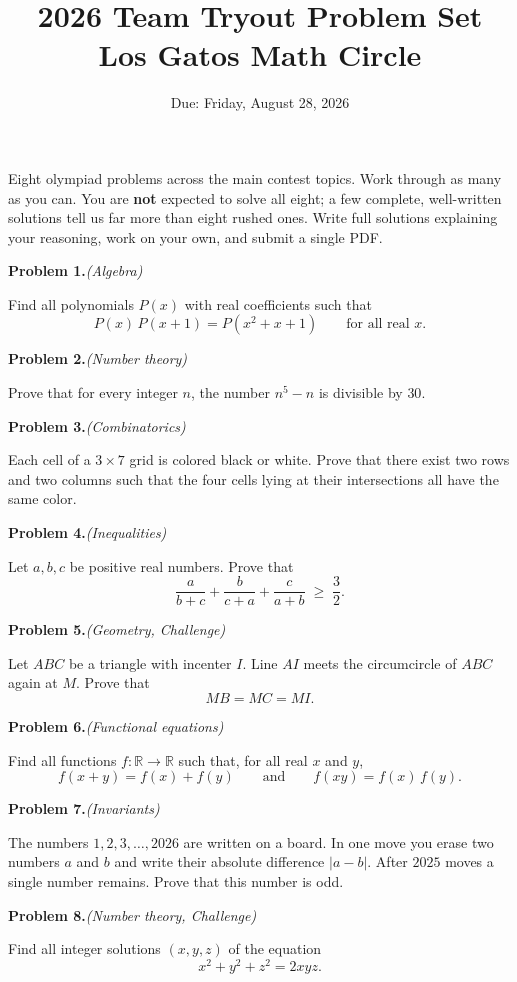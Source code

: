 \documentclass[11pt]{article}
\title{\vspace{-1.6cm}\textbf{2026 Team Tryout Problem Set}\\[0.2em]
\large Los Gatos Math Circle}
\author{}
\date{Due: Friday, August 28, 2026}
\newcommand{\problem}[2]{%
  \par\smallskip\noindent\textbf{Problem #1.}\quad\textit{(#2)}\par}
\begin{document}
\maketitle
\vspace{-1em}

\noindent
Eight olympiad problems across the main contest topics. Work through as many as
you can. You are \textbf{not} expected to solve all eight; a few complete,
well-written solutions tell us far more than eight rushed ones. Write full
solutions explaining your reasoning, work on your own, and submit a single PDF.

\medskip

\problem{1}{Algebra}
Find all polynomials $P(x)$ with real coefficients such that
\[
  P(x)\,P(x+1) = P\!\left(x^2 + x + 1\right) \qquad \text{for all real } x.
\]

\problem{2}{Number theory}
Prove that for every integer $n$, the number $n^5 - n$ is divisible by $30$.

\problem{3}{Combinatorics}
Each cell of a $3 \times 7$ grid is colored black or white. Prove that there
exist two rows and two columns such that the four cells lying at their
intersections all have the same color.

\problem{4}{Inequalities}
Let $a, b, c$ be positive real numbers. Prove that
\[
  \frac{a}{b+c} + \frac{b}{c+a} + \frac{c}{a+b} \;\ge\; \frac{3}{2}.
\]

\problem{5}{Geometry, Challenge}
Let $ABC$ be a triangle with incenter $I$. Line $AI$ meets the circumcircle of
$ABC$ again at $M$. Prove that
\[
  MB = MC = MI.
\]

\problem{6}{Functional equations}
Find all functions $f : \mathbb{R} \to \mathbb{R}$ such that, for all real $x$
and $y$,
\[
  f(x+y) = f(x) + f(y) \qquad \text{and} \qquad f(xy) = f(x)\,f(y).
\]

\problem{7}{Invariants}
The numbers $1, 2, 3, \dots, 2026$ are written on a board. In one move you erase
two numbers $a$ and $b$ and write their absolute difference $|a - b|$. After
$2025$ moves a single number remains. Prove that this number is odd.

\problem{8}{Number theory, Challenge}
Find all integer solutions $(x, y, z)$ of the equation
\[
  x^2 + y^2 + z^2 = 2xyz.
\]
\end{document}
